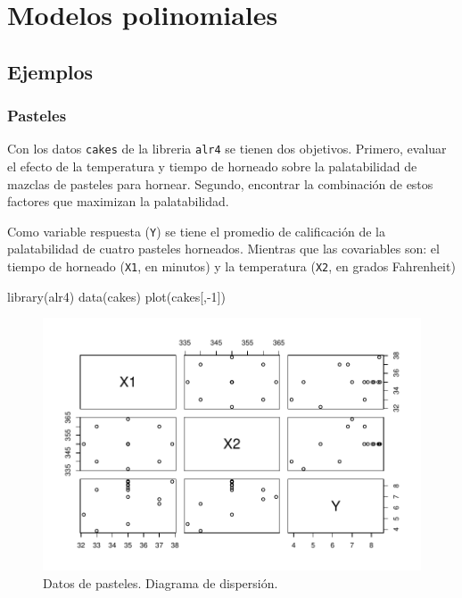\documentclass[
]{article}
\newenvironment{Shaded}{\begin{snugshade}}{\end{snugshade}}
\newcommand{\DecValTok}[1]{\textcolor[rgb]{0.00,0.00,0.81}{#1}}
\newcommand{\FunctionTok}[1]{\textcolor[rgb]{0.00,0.00,0.00}{#1}}
\newcommand{\NormalTok}[1]{#1}
\newcommand{\SpecialCharTok}[1]{\textcolor[rgb]{0.00,0.00,0.00}{#1}}
\begin{document}
\hypertarget{modelos-polinomiales}{%
\section{Modelos polinomiales}\label{modelos-polinomiales}}

\hypertarget{ejemplos-1}{%
\subsection{Ejemplos}\label{ejemplos-1}}

\hypertarget{pasteles}{%
\subsubsection{Pasteles}\label{pasteles}}

Con los datos \texttt{cakes} de la libreria \texttt{alr4} se tienen dos objetivos. Primero, evaluar el efecto de la temperatura y tiempo de horneado sobre la palatabilidad de mazclas de pasteles para hornear. Segundo, encontrar la combinación de estos factores que maximizan la palatabilidad.

Como variable respuesta (\texttt{Y}) se tiene el promedio de calificación de la palatabilidad de cuatro pasteles horneados. Mientras que las covariables son: el tiempo de horneado (\texttt{X1}, en minutos) y la temperatura (\texttt{X2}, en grados Fahrenheit)

\begin{Shaded}
\begin{Highlighting}[]
\FunctionTok{library}\NormalTok{(alr4)}
\FunctionTok{data}\NormalTok{(cakes)}
\FunctionTok{plot}\NormalTok{(cakes[,}\SpecialCharTok{{-}}\DecValTok{1}\NormalTok{])}
\end{Highlighting}
\end{Shaded}

\begin{figure}

{\centering \includegraphics{MLG2_files/figure-latex/CakesFigure-1} 

}

\caption{Datos de pasteles. Diagrama de dispersión.}\label{fig:CakesFigure}
\end{figure}
\end{document}
